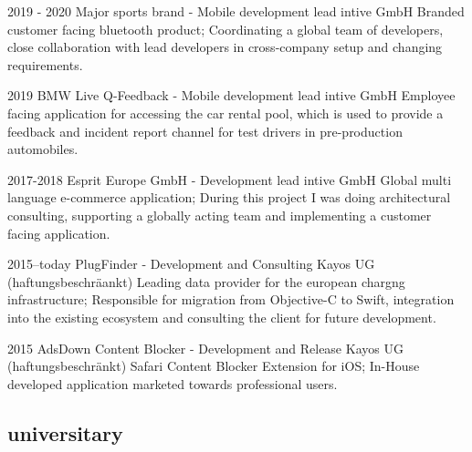 \documentclass[]{friggeri-cv} %
\begin{document}
\begin{entrylist}
	
	\entry
	{2019 - 2020}
	{Major sports brand - Mobile development lead}
	{intive GmbH}
	{Branded customer facing bluetooth product; Coordinating a global team of developers, close collaboration with lead developers in cross-company setup and changing requirements.}
	
	
	
	\entry
	{2019}
	{BMW Live Q-Feedback - Mobile development lead}
	{intive GmbH}
	{Employee facing application for accessing the car rental pool, which is used to provide a feedback and incident report channel for test drivers in pre-production automobiles.}
	
	
	\entry
	{2017-2018}
	{Esprit Europe GmbH - Development lead}
	{intive GmbH}
	{Global multi language e-commerce application; During this project I was doing architectural consulting, supporting a globally acting team and implementing a customer facing application.}
	
	
	\entry
	{2015--today}
	{PlugFinder - Development and Consulting}
	{Kayos UG (haftungsbeschr\"{a}ankt)}
	{Leading data provider for the european chargng infrastructure; Responsible for migration from Objective-C to Swift, integration into the existing ecosystem and consulting the client for future development.}
	
	
	\entry
	{2015}
	{AdsDown Content Blocker - Development and Release}
	{Kayos UG (haftungsbeschr\"{a}nkt)}
	{Safari Content Blocker Extension for iOS; In-House developed application marketed towards professional users.}
	
	
	
	
\end{entrylist}

\subsection{universitary}
\end{document}
